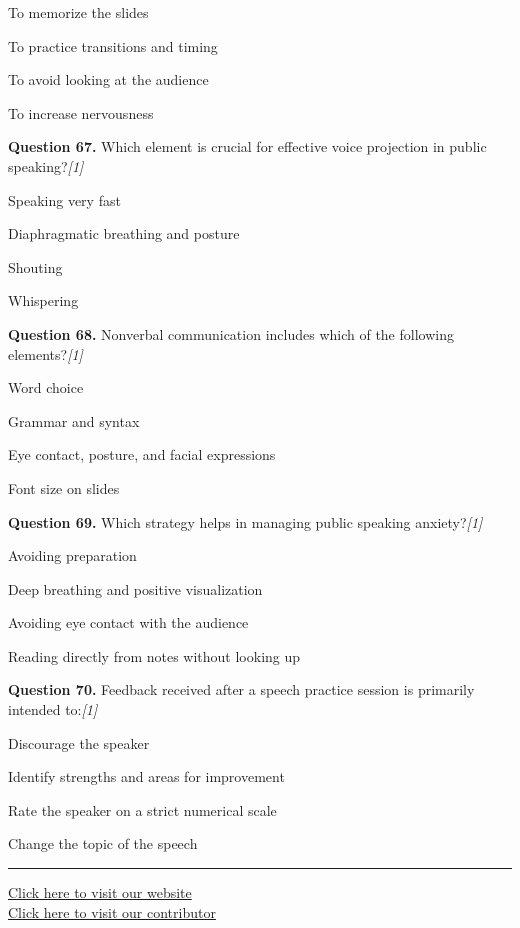 \documentclass[11pt,a4paper]{article}
\newcommand{\pts}[1]{\hfill   \textit{[#1]}}
\begin{document}
\begin{parts}
  \item To memorize the slides
  \item To practice transitions and timing
  \item To avoid looking at the audience
  \item To increase nervousness
\end{parts}

\medskip


\noindent   \textbf{Question 67.} Which element is crucial for effective voice projection in public speaking?\pts{1}

\begin{parts}
  \item Speaking very fast
  \item Diaphragmatic breathing and posture
  \item Shouting
  \item Whispering
\end{parts}

\medskip


\noindent   \textbf{Question 68.} Nonverbal communication includes which of the following elements?\pts{1}

\begin{parts}
  \item Word choice
  \item Grammar and syntax
  \item Eye contact, posture, and facial expressions
  \item Font size on slides
\end{parts}

\medskip


\noindent   \textbf{Question 69.} Which strategy helps in managing public speaking anxiety?\pts{1}

\begin{parts}
  \item Avoiding preparation
  \item Deep breathing and positive visualization
  \item Avoiding eye contact with the audience
  \item Reading directly from notes without looking up
\end{parts}

\medskip


\noindent   \textbf{Question 70.} Feedback received after a speech practice session is primarily intended to:\pts{1}

\begin{parts}
  \item Discourage the speaker
  \item Identify strengths and areas for improvement
  \item Rate the speaker on a strict numerical scale
  \item Change the topic of the speech
\end{parts}

\medskip

\vfill
\rule{\linewidth}{0.4pt}

\begin{center}\small
\href{https://bhu-exam.vercel.app/}{Click here to visit our website}\\[4pt]
\href{https://me-aryan.vercel.app/}{Click here to visit our contributor}
\end{center}
\end{document}

